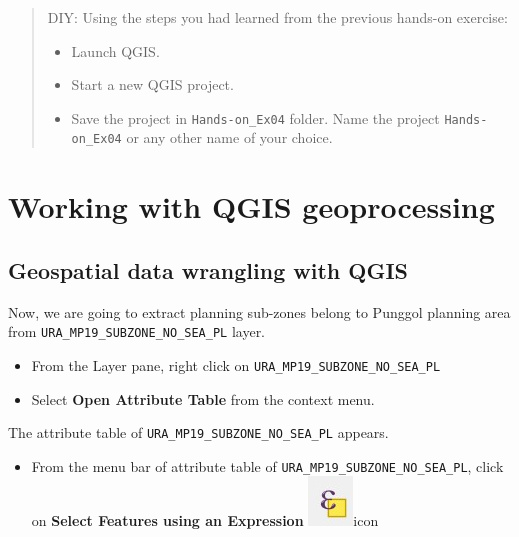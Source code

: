 \documentclass[
  letterpaper,
  DIV=11,
  numbers=noendperiod]{scrreprt}
\providecommand{\tightlist}{%
  \setlength{\itemsep}{0pt}\setlength{\parskip}{0pt}}\usepackage{longtable,booktabs,array}
\begin{document}
\begin{quote}
DIY: Using the steps you had learned from the previous hands-on
exercise:

\begin{itemize}
\item
  Launch QGIS.
\item
  Start a new QGIS project.
\item
  Save the project in \texttt{Hands-on\_Ex04} folder. Name the project
  \texttt{Hands-on\_Ex04} or any other name of your choice.
\end{itemize}
\end{quote}

\hypertarget{working-with-qgis-geoprocessing}{%
\section{Working with QGIS
geoprocessing}\label{working-with-qgis-geoprocessing}}

\hypertarget{geospatial-data-wrangling-with-qgis}{%
\subsection{Geospatial data wrangling with
QGIS}\label{geospatial-data-wrangling-with-qgis}}

Now, we are going to extract planning sub-zones belong to Punggol
planning area from \texttt{URA\_MP19\_SUBZONE\_NO\_SEA\_PL} layer.

\begin{itemize}
\tightlist
\item
  From the Layer pane, right click on
  \texttt{URA\_MP19\_SUBZONE\_NO\_SEA\_PL}
\item
  Select \textbf{Open Attribute Table} from the context menu.
\end{itemize}

The attribute table of \texttt{URA\_MP19\_SUBZONE\_NO\_SEA\_PL} appears.

\begin{itemize}
\tightlist
\item
  From the menu bar of attribute table of
  \texttt{URA\_MP19\_SUBZONE\_NO\_SEA\_PL}, click on \textbf{Select
  Features using an Expression} \includegraphics{./img04/image3.jpg}icon
\end{itemize}
\end{document}
